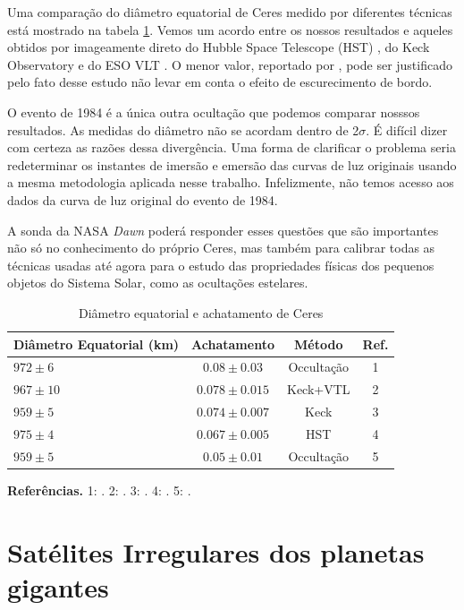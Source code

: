 \documentclass[12pt,a4paper]{monografia}
\begin{document}
Uma comparação do diâmetro equatorial de Ceres medido por diferentes técnicas está mostrado na tabela \ref{Tab: Ceres-final}. Vemos um acordo entre os nossos resultados e aqueles obtidos por imageamente direto do Hubble Space Telescope (HST) \citep{Thomas2005}, do Keck Observatory e do ESO VLT \citep{Drummond2014}. O menor valor, reportado por \cite{Carry2008}, pode ser justificado pelo fato desse estudo não levar em conta o efeito de escurecimento de bordo.

O evento de 1984 \citep{Millis1987} é a única outra ocultação que podemos comparar nosssos resultados. As medidas do diâmetro não se acordam dentro de 2$\sigma$. É difícil dizer com certeza as razões dessa divergência. Uma forma de clarificar o problema seria redeterminar os instantes de imersão e emersão das curvas de luz originais usando a mesma metodologia aplicada nesse trabalho. Infelizmente, não temos acesso aos dados da curva de luz original do evento de 1984.

A sonda da NASA \textit{Dawn} poderá responder esses questões que são importantes não só no conhecimento do próprio Ceres, mas também para calibrar todas as técnicas usadas até agora para o estudo das propriedades físicas dos pequenos objetos do Sistema Solar, como as ocultações estelares.

\begin{table}[h]
  \caption{Diâmetro equatorial e achatamento de Ceres \label{Tab: Ceres-final}}
  \begin{centering}
  \begin{tabular}{@{}lccc}
  \hline
     Diâmetro Equatorial (km) & Achatamento & Método & Ref. \\
\hline
$972 \pm 6$  & $0.08  \pm 0.03$  & Occultação & 1\\
$967 \pm 10$ & $0.078 \pm 0.015$ & Keck+VTL    & 2\\
$959 \pm 5$  & $0.074 \pm 0.007$ & Keck        & 3\\
$975 \pm 4$  & $0.067 \pm 0.005$ & HST         & 4\\
$959 \pm 5$  & $0.05  \pm 0.01$  & Occultação & 5\\
\hline
\end{tabular}
\par\end{centering}
\textbf{Referências.} 1: \cite{GomesJunior2015-Ceres}. 2: \cite{Drummond2014}. 3: \cite{Carry2008}. 4: \cite{Thomas2005}. 5: \cite{Millis1987}.
\end{table}


\chapter{Satélites Irregulares dos planetas gigantes}
\label{Cap: Irregulares}
\end{document}
